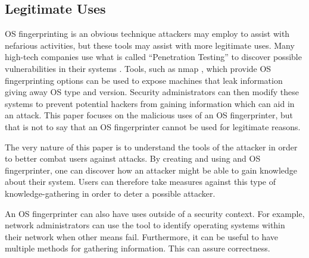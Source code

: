 \subsection{Legitimate Uses}
OS fingerprinting is an obvious technique attackers may employ to assist with nefarious activities, but these tools may assist with more legitimate uses.  Many high-tech companies use what is called ``Penetration Testing'' to discover possible vulnerabilities in their systems \cite{Glynn12}.  Tools, such as nmap \cite{nmap1}, which provide OS fingerprinting options can be used to expose machines that leak information giving away OS type and version.  Security administrators can then modify these systems to prevent potential hackers from gaining information which can aid in an attack.  This paper focuses on the malicious uses of an OS fingerprinter, but that is not to say that an OS fingerprinter cannot be used for legitimate reasons. 

The very nature of this paper is to understand the tools of the attacker in order to better combat users against attacks. By creating and using and OS fingerprinter, one can discover how an attacker might be able to gain knowledge about their system. Users can therefore take measures against this type of knowledge-gathering in order to deter a possible attacker.

An OS fingerprinter can also have uses outside of a security context. For example, network administrators can use the tool to identify operating systems within their network when other means fail. Furthermore, it can be useful to have multiple methods for gathering information. This can assure correctness.

